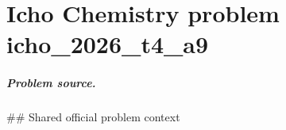
\chapter{Icho Chemistry problem icho\_2026\_t4\_a9}
\label{ch:IChO2026Problems_problem_icho_2026_t4_a9}

\paragraph{Problem source.}
\#\# Shared official problem context
